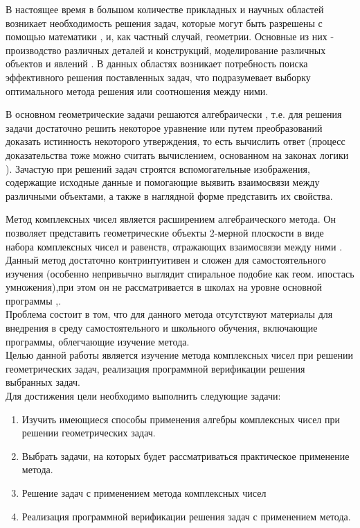 


\lstset{language=[11]C++}


\thispagestyle{empty}
\clearpage

\tableofcontents

В настоящее время в большом количестве прикладных и научных областей возникает необходимость решения задач, которые могут быть разрешены с помощью математики \cite{book:sloyer}, и, как частный случай, геометрии. Основные из них - производство различных деталей и конструкций, моделирование
различных объектов и явлений \cite[стр. 15]{book:kosnevsky}. В данных областях возникает потребность поиска эффективного решения
поставленных задач, что подразумевает выборку оптимального метода решения или соотношения между ними.

В основном геометрические задачи решаются алгебраически \cite{geom:methods}, т.е. для решения задачи достаточно решить некоторое уравнение или путем преобразований доказать истинность некоторого утверждения, то есть вычислить ответ (процесс доказательства тоже можно считать вычислением, основанном на законах логики \cite[стр. 8]{book:takeuti}).
Зачастую при решений задач строятся вспомогательные изображения, содержащие исходные данные и помогающие выявить взаимосвязи между различными объектами, а также в наглядной форме представить их свойства.

Метод комплексных чисел является расширением алгебраического метода.
Он позволяет представить геометрические объекты 2-мерной плоскости в виде набора комплексных
чисел и равенств, отражающих взаимосвязи между ними \cite[стр. 3]{book:arnold_complex}.\\
Данный метод достаточно контринтуитивен и сложен для самостоятельного изучения (особенно
непривычно выглядит спиральное подобие как геом. ипостась умножения),при этом он не рассматривается
в школах на уровне основной программы \cite{edu:problem},\cite[стр.6]{book:ponarin}.\\
Проблема состоит в том, что для данного метода отсутствуют материалы для внедрения в среду
самостоятельного и школьного обучения, включающие программы, облегчающие изучение метода.\\
Целью данной работы является изучение метода комплексных чисел при решении геометрических задач,
реализация программной верификации решения выбранных задач.\\
Для достижения цели необходимо выполнить следующие задачи:
\begin{enumerate}
   \item Изучить имеющиеся способы применения алгебры комплексных чисел при решении геометрических
         задач.
   \item Выбрать задачи, на которых будет рассматриваться практическое применение метода.
   \item Решение задач с применением метода комплексных чисел
   \item Реализация программной верификации решения задач с применением метода.
\end{enumerate}

